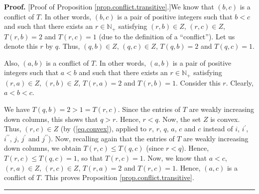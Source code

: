 \documentclass[numbers=enddot,12pt,final,onecolumn,notitlepage]{scrartcl}%
\theoremstyle{definition}
\newenvironment{proof}[1][Proof]{\noindent\textbf{#1.} }{\ \rule{0.5em}{0.5em}}
\newenvironment{noncompile}{}{}
\begin{document}
\begin{noncompile}
\begin{proof}
[Proof of Proposition \ref{prop.conflict.transitive}.]We know that $\left(
b,c\right)  $ is a conflict of $T$. In other words, $\left(  b,c\right)  $ is
a pair of positive integers such that $b<c$ and such that there exists an
$r\in\mathbb{N}_{+}$ satisfying $\left(  r,b\right)  \in Z$, $\left(
r,c\right)  \in Z$, $T\left(  r,b\right)  =2$ and $T\left(  r,c\right)  =1$
(due to the definition of a \textquotedblleft conflict\textquotedblright). Let
us denote this $r$ by $q$. Thus, $\left(  q,b\right)  \in Z$, $\left(
q,c\right)  \in Z$, $T\left(  q,b\right)  =2$ and $T\left(  q,c\right)  =1$.

Also, $\left(  a,b\right)  $ is a conflict of $T$. In other words, $\left(
a,b\right)  $ is a pair of positive integers such that $a<b$ and such that
there exists an $r\in\mathbb{N}_{+}$ satisfying $\left(  r,a\right)  \in Z$,
$\left(  r,b\right)  \in Z$, $T\left(  r,a\right)  =2$ and $T\left(
r,b\right)  =1$. Consider this $r$. Clearly, $a<b<c$.

We have $T\left(  q,b\right)  =2>1=T\left(  r,c\right)  $. Since the entries
of $T$ are weakly increasing down columns, this shows that $q>r$. Hence,
$r<q$. Now, the set $Z$ is convex. Thus, $\left(  r,c\right)  \in Z$ (by
(\ref{eq.convex}), applied to $r$, $r$, $q$, $a$, $c$ and $c$ instead of $i$,
$i^{\prime}$, $i^{\prime\prime}$, $j$, $j^{\prime}$ and $j^{\prime\prime}$).
Now, recalling again that the entries of $T$ are weakly increasing down
columns, we obtain $T\left(  r,c\right)  \leq T\left(  q,c\right)  $ (since
$r<q$). Hence, $T\left(  r,c\right)  \leq T\left(  q,c\right)  =1$, so that
$T\left(  r,c\right)  =1$. Now, we know that $a<c$, $\left(  r,a\right)  \in
Z$, $\left(  r,c\right)  \in Z$, $T\left(  r,a\right)  =2$ and $T\left(
r,c\right)  =1$. Hence, $\left(  a,c\right)  $ is a conflict of $T$. This
proves Proposition \ref{prop.conflict.transitive}.
\end{proof}
\end{noncompile}
\end{document}
